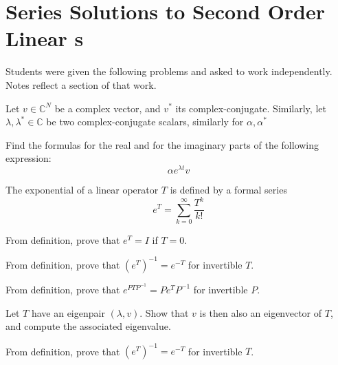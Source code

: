 \newpage
\chapter{Series Solutions to Second Order Linear \ode{}s}
\begin{fullwidth}
\begin{highlight}

Students were given the following problems and asked to work independently. Notes reflect a section of that work.

\begin{example}
  Let \(v \in \mathbb{C}^{N}\) be a complex vector, and \(v^{\ast}\) its complex-conjugate. Similarly, let \(\lambda, \lambda^{\ast} \in \mathbb{C}\) be two complex-conjugate scalars, similarly for \(\alpha, \alpha^{\ast}\)

  Find the formulas for the real and for the imaginary parts
  of the following expression: \[ \alpha e^{\lambda t} v \]

\end{example}

The exponential of a linear operator \(T\) is defined by a formal series
\[e^{T} = \sum_{k=0}^{\infty} \frac{T^{k}}{k!}\]

\begin{example}
  From definition, prove that \(e^{T} = I\) if \(T = 0\).
\end{example}

\begin{example}
  From definition, prove that \(\left(e^{T}\right)^{-1} = e^{-T}\) for invertible \(T\).
\end{example}

\begin{example}
  From definition, prove that \(e^{PTP^{-1}} = Pe^{T}P^{-1}\) for invertible \(P\).
\end{example}

\begin{example}
  Let \(T\) have an eigenpair \((\lambda, v)\). Show that \(v\) is then also an eigenvector of \(T\), and compute the associated eigenvalue.
\end{example}

\begin{example}
  From definition, prove that \(\left(e^{T}\right)^{-1} = e^{-T}\) for invertible \(T\).
\end{example}


\end{highlight}
\end{fullwidth}
